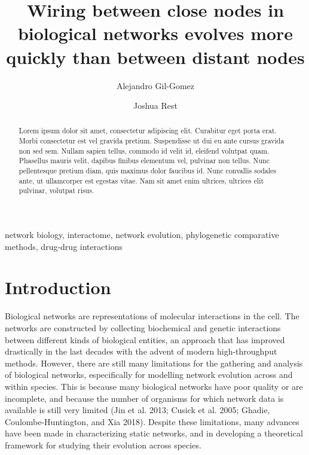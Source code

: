 \documentclass[]{elsarticle} %
\begin{document}
\begin{frontmatter}

  \title{Wiring between close nodes in biological networks evolves more quickly than between distant nodes}
    \author[Stony Brook University]{Alejandro Gil-Gomez}
    \author[Stony Brook University]{Joshua Rest}
      \address[Stony Brook University]{Department of Ecology \& Evolution, Stony Brook University, 650 Life Sciences Building, Stony Brook, NY 11794-5245}
    
  \begin{abstract}
  Lorem ipsum dolor sit amet, consectetur adipiscing elit. Curabitur eget porta erat. Morbi consectetur est vel gravida pretium. Suspendisse ut dui eu ante cursus gravida non sed sem. Nullam sapien tellus, commodo id velit id, eleifend volutpat quam. Phasellus mauris velit, dapibus finibus elementum vel, pulvinar non tellus. Nunc pellentesque pretium diam, quis maximus dolor faucibus id. Nunc convallis sodales ante, ut ullamcorper est egestas vitae. Nam sit amet enim ultrices, ultrices elit pulvinar, volutpat risus.
  \end{abstract}
   \begin{keyword} network biology, interactome, network evolution, phylogenetic comparative methods, drug-drug interactions\end{keyword}
 \end{frontmatter}

\hypertarget{introduction}{%
\section{Introduction}\label{introduction}}

Biological networks are representations of molecular interactions in the cell. The networks are constructed by collecting biochemical and genetic interactions between different kinds of biological entities, an approach that has improved drastically in the last decades with the advent of modern high-throughput methods. However, there are still many limitations for the gathering and analysis of biological networks, especifically for modelling network evolution across and within species. This is because many biological networks have poor quality or are incomplete, and because the number of organisms for which network data is available is still very limited (Jin et al. 2013; Cusick et al. 2005; Ghadie, Coulombe-Huntington, and Xia 2018). Despite these limitations, many advances have been made in characterizing static networks, and in developing a theoretical framework for studying their evolution across species.
\end{document}
